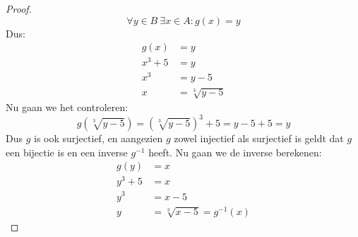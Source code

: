 \documentclass{article}
\begin{document}
\begin{enumerate}[label=\alph*)]
\begin{proof}
                \[\forall y \in B \ \exists x \in A : g(x) = y\]
                Dus:
                \begin{align*}
                    g(x) &= y \\
                    x^3 + 5 &= y \\
                    x^3 &= y - 5 \\
                    x &= \sqrt[3]{y-5}
                \end{align*}
                Nu gaan we het controleren:
                \[g(\sqrt[3]{y-5})=(\sqrt[3]{y-5})^3 + 5 = y-5 + 5 = y\]
                Dus $g$ is ook surjectief, en aangezien $g$ zowel injectief als surjectief is geldt dat $g$ een bijectie is en een inverse $g^{-1}$ heeft.
                Nu gaan we de inverse berekenen:
                \begin{align*}
                    g(y) &= x \\
                    y^3 + 5 &= x \\  
                    y^3 &= x - 5 \\
                    y &= \sqrt[3]{x-5} = g^{-1}(x)
                \end{align*}

            \end{proof}
    \end{enumerate}
\end{document}
